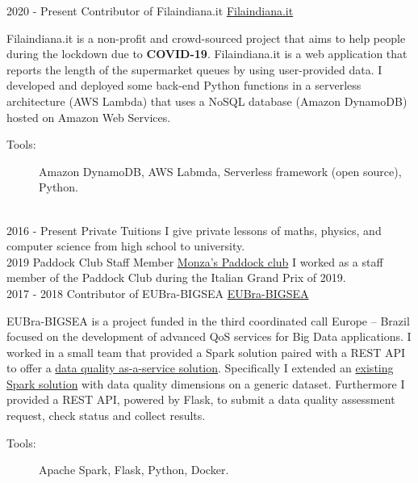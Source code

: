 \documentclass[letterpaper]{twentysecondcv} %
\begin{document}
\begin{twenty} %
	\twentyitem
	{2020 -}
	{Present}
	{Contributor of Filaindiana.it}
	{\href{https://www.filaindiana.it}{Filaindiana.it}}
	{}
	{Filaindiana.it is a non-profit and crowd-sourced project that aims to help people during the lockdown due to \textbf{COVID-19}. Filaindiana.it is a web application that reports the length of the supermarket queues by using user-provided data. I developed and deployed some back-end Python functions in a serverless architecture (AWS Lambda) that uses a NoSQL database (Amazon DynamoDB) hosted on Amazon Web Services.
		\begin{description}
			\item[Tools:] Amazon DynamoDB, AWS Labmda, Serverless framework (open source), Python.
		\end{description}}
	\\
	\twentyitem
	{2016 -}
	{Present}
	{Private Tuitions}
	{}
	{}
	{I give private lessons of maths, physics, and computer science from high school to university.}
	\\
	\twentyitem
	{2019}
	{}
	{Paddock Club Staff Member}
	{\href{https://tickets.formula1.com/it/h-formula1-hospitality}{Monza's Paddock club}}
	{}
	{I worked as a staff member of the Paddock Club during the Italian Grand Prix of 2019.}
	\\
	\twentyitem
	{2017 -}
	{2018}
	{Contributor of EUBra-BIGSEA}
	{\href{https://www.eubra-bigsea.eu}{EUBra-BIGSEA}}
	{}
	{EUBra-BIGSEA is a project funded in the third coordinated call Europe – Brazil focused on the development of advanced QoS services for Big Data applications. I worked in a small team that provided a Spark solution paired with a REST API to offer a \href{https://www.eubra-bigsea.eu/node/301}{data quality as-a-service solution}. Specifically I extended an \href{https://www.politesi.polimi.it/handle/10589/134468}{existing Spark solution} with data quality dimensions on a generic dataset. Furthermore I provided a REST API, powered by Flask, to submit a data quality assessment request, check status and collect results.
		\begin{description}
			\item[Tools:] Apache Spark, Flask, Python, Docker.
		\end{description}}
\end{twenty}
\end{document}
